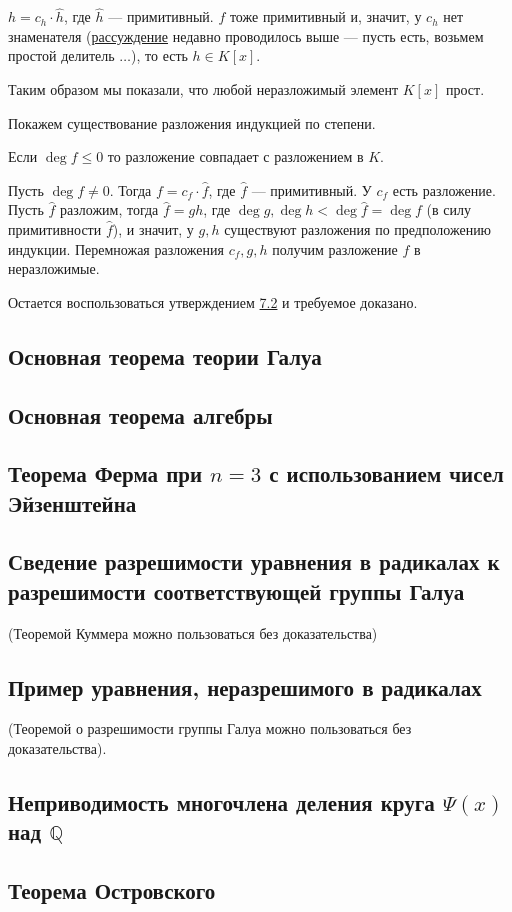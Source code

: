 \documentclass[../main.tex]{subfiles}
\begin{document}
    $h = c_h \cdot \hat{h}$, где $\hat{h}$ --- примитивный. $f$ тоже примитивный
    и, значит, у $c_h$ нет знаменателя
    (\hyperlink{9.3.no.denominator}{рассуждение} недавно проводилось выше ---
    пусть есть, возьмем простой делитель $\ldots$), то есть $h \in K[x]$.

    Таким образом мы показали, что любой неразложимый элемент $K[x]$ прост.

    Покажем существование разложения индукцией по степени.

    Если $\deg f \leqslant 0$ то разложение совпадает с разложением в $K$.

    Пусть $\deg f \ne 0$. Тогда $f = c_f \cdot \hat{f}$,
    где $\hat{f}$ --- примитивный. У $c_f$ есть разложение. Пусть
    $\hat{f}$ разложим, тогда $\hat{f} = gh$, где $\deg g, \deg h
    < \deg \hat{f} = \deg f$ (в силу примитивности $\hat{f}$), и значит,
    у $g, h$ существуют разложения по предположению индукции.
    Перемножая разложения $c_f, g, h$ получим разложение $f$ в неразложимые.

    Остается воспользоваться утверждением \hyperlink{7.2}{7.2} и
    требуемое доказано.

\hypertarget{9.4}{\subsection{Основная теорема теории Галуа}}
\hypertarget{9.5}{\subsection{Основная теорема алгебры}}

\hypertarget{9.6}{\subsection{Теорема Ферма при $n = 3$ с использованием чисел Эйзенштейна}}

\hypertarget{9.7}{\subsection{Сведение разрешимости уравнения в радикалах к разрешимости соответствующей группы Галуа}}
(Теоремой Куммера можно пользоваться без доказательства)
\hypertarget{9.8}{\subsection{Пример уравнения, неразрешимого в радикалах}}
(Теоремой о разрешимости группы Галуа можно пользоваться без доказательства).

\hypertarget{9.9}{\subsection{Неприводимость многочлена деления круга $\Psi(x)$ над $\mathbb{Q}$}}

\hypertarget{9.10}{\subsection{Теорема Островского}}
\end{document}
